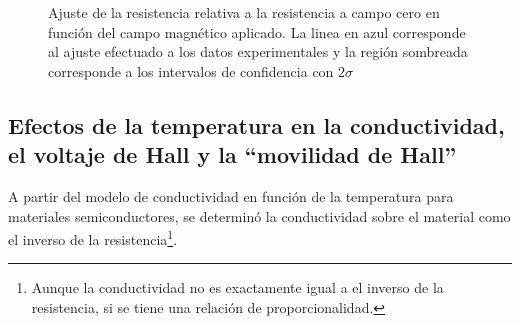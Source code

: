 \documentclass[%
 reprint,
 amsmath,amssymb,
 aps,
]{revtex4-1}
\begin{document}
\begin{figure}[h]
\caption{\label{R_vs_Campo}Ajuste de la resistencia relativa a la resistencia a campo cero en función del campo magnético aplicado.  La linea en azul corresponde al ajuste efectuado a los datos experimentales y la región sombreada corresponde a los intervalos de confidencia con $2\sigma$}
\end{figure}

\subsection{Efectos de la temperatura en la conductividad, el voltaje de Hall y la ``movilidad de Hall''}
A partir del modelo de conductividad en función de la temperatura para materiales semiconductores, se determinó la conductividad sobre el material como el inverso de la resistencia\footnote{Aunque la conductividad no es exactamente igual a el inverso de la resistencia, si se tiene una relación de proporcionalidad.}.
\end{document}
